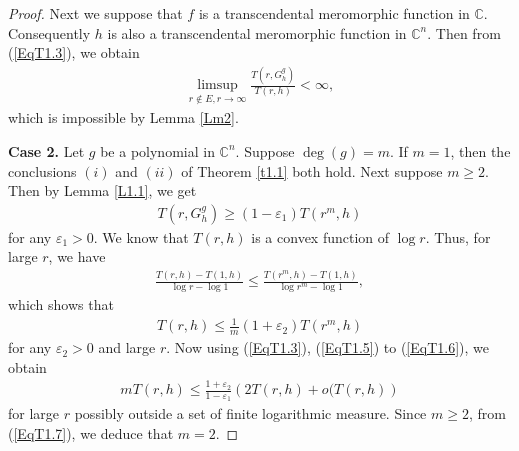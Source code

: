 \documentclass[11pt,reqno]{amsart}
\numberwithin{equation}{section}
\begin{document}
\begin{proof}
\medskip
Next we suppose that $f$ is a transcendental meromorphic function in $\mathbb{C}$. Consequently $h$ is also a transcendental meromorphic function in $\mathbb{C}^n$. Then from (\ref{EqT1.3}), we obtain 
\begin{align*}
\limsup\limits_{r\not\in E, r\to\infty}\frac{T\left(r,G^g_h\right)}{T(r,h)}<\infty,
\end{align*}
which is impossible by Lemma \ref{Lm2}.


\medskip
{\bf Case 2.} Let $g$ be a polynomial in $\mathbb{C}^n$. Suppose $\deg(g)=m$. If $m =1$, then
the conclusions $(i)$ and $(ii)$ of Theorem \ref{t1.1} both hold. Next suppose $m\geq 2$. Then by Lemma \ref{L1.1}, we get
\begin{align}\label{EqT1.5}
T\left(r,G^g_h\right)\geq (1-\varepsilon_1)T(r^m,h)
\end{align}
for any $\varepsilon_1>0$. We know that $T(r, h)$ is a convex function of $\log r$. Thus, for large $r$, we have 
\begin{align*}
\frac{T(r,h)-T(1,h)}{\log r-\log 1}\leq \frac{T(r^m,h)-T(1,h)}{\log r^m-\log 1},
\end{align*}
which shows that 
\begin{align}\label{EqT1.6}
T(r,h)\leq \frac{1}{m}(1+\varepsilon_2)T\left(r^m,h\right)
\end{align}
for any $\varepsilon_2>0$ and large $r$. Now using (\ref{EqT1.3}), (\ref{EqT1.5}) to (\ref{EqT1.6}), we obtain
\begin{align}\label{EqT1.7}
mT(r,h)\leq \frac{1+\varepsilon_2}{1-\varepsilon_1}\left(2T(r,h)+o(T(r,h)\right)
\end{align} 
for large $r$ possibly outside a set of finite logarithmic measure. Since $m\geq 2$,  from (\ref{EqT1.7}), we deduce that $m= 2$.


\end{proof}
\end{document}
